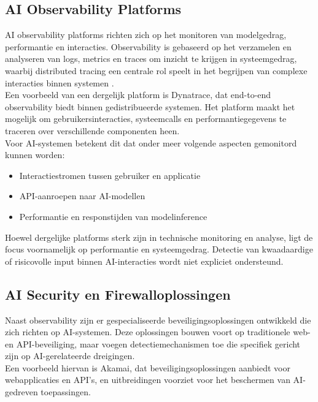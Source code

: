 \subsection{AI Observability Platforms}

AI observability platforms richten zich op het monitoren van modelgedrag, performantie en interacties. Observability is gebaseerd op het verzamelen en analyseren van logs, metrics en traces om inzicht te krijgen in systeemgedrag, waarbij distributed tracing een centrale rol speelt in het begrijpen van complexe interacties binnen systemen \autocite{sigelman2010dapper}.\\

Een voorbeeld van een dergelijk platform is Dynatrace, dat end-to-end observability biedt binnen gedistribueerde systemen. Het platform maakt het mogelijk om gebruikersinteracties, systeemcalls en performantiegegevens te traceren over verschillende componenten heen.\\

Voor AI-systemen betekent dit dat onder meer volgende aspecten gemonitord kunnen worden:

\begin{itemize}
    \item Interactiestromen tussen gebruiker en applicatie
    \item API-aanroepen naar AI-modellen
    \item Performantie en responstijden van modelinference
\end{itemize}

Hoewel dergelijke platforms sterk zijn in technische monitoring en analyse, ligt de focus voornamelijk op performantie en systeemgedrag. Detectie van kwaadaardige of risicovolle input binnen AI-interacties wordt niet expliciet ondersteund.

\subsection{AI Security en Firewalloplossingen}

Naast observability zijn er gespecialiseerde beveiligingsoplossingen ontwikkeld die zich richten op AI-systemen. Deze oplossingen bouwen voort op traditionele web- en API-beveiliging, maar voegen detectiemechanismen toe die specifiek gericht zijn op AI-gerelateerde dreigingen.\\

Een voorbeeld hiervan is Akamai, dat beveiligingsoplossingen aanbiedt voor webapplicaties en API’s, en uitbreidingen voorziet voor het beschermen van AI-gedreven toepassingen.\\


